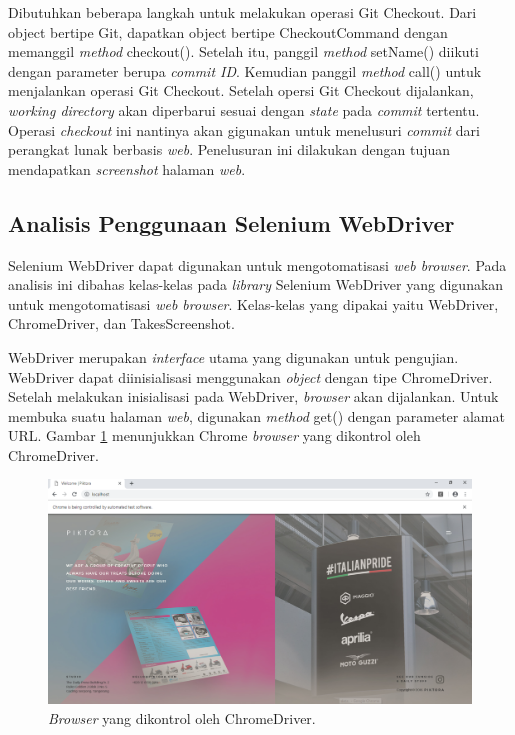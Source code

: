 Dibutuhkan beberapa langkah untuk melakukan operasi Git Checkout. Dari object bertipe Git, dapatkan object bertipe CheckoutCommand dengan memanggil \textit{method} checkout(). Setelah itu, panggil \textit{method} setName() diikuti dengan parameter berupa \textit{commit ID}. Kemudian panggil \textit{method} call() untuk menjalankan operasi Git Checkout. Setelah opersi Git Checkout dijalankan, \textit{working directory} akan diperbarui sesuai dengan \textit{state} pada \textit{commit} tertentu. Operasi \textit{checkout} ini nantinya akan gigunakan untuk menelusuri \textit{commit} dari perangkat lunak berbasis \textit{web}. Penelusuran ini dilakukan dengan tujuan mendapatkan \textit{screenshot} halaman \textit{web}.    


\subsection{Analisis Penggunaan Selenium WebDriver}
\label{subsec:analisis_selenium}
Selenium WebDriver dapat digunakan untuk mengotomatisasi \textit{web browser}. Pada analisis ini dibahas kelas-kelas pada \textit{library} Selenium WebDriver yang digunakan untuk mengotomatisasi \textit{web browser}. 
Kelas-kelas yang dipakai yaitu WebDriver, ChromeDriver, dan TakesScreenshot.


WebDriver merupakan \textit{interface} utama yang digunakan untuk pengujian. WebDriver dapat diinisialisasi menggunakan \textit{object} dengan tipe ChromeDriver. Setelah melakukan inisialisasi pada WebDriver, \textit{browser} akan dijalankan. Untuk membuka suatu halaman \textit{web}, digunakan \textit{method} get() dengan parameter alamat URL. Gambar \ref{fig:webdriver} menunjukkan Chrome \textit{browser} yang dikontrol oleh ChromeDriver. 

\begin{figure}[H]
	\centering
		\includegraphics[scale=0.5]{Gambar/ChromeDriver.png}
	\caption{\textit{Browser} yang dikontrol oleh ChromeDriver.}
	\label{fig:webdriver}
\end{figure}



